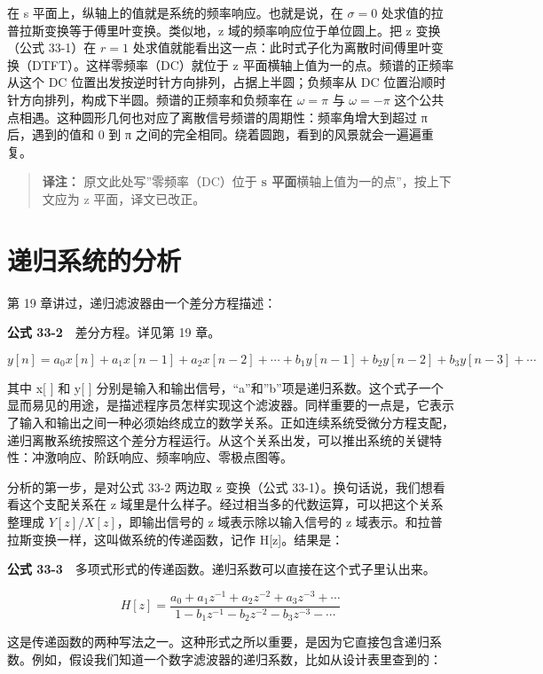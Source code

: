 在 s 平面上，纵轴上的值就是系统的频率响应。也就是说，在 \(\sigma = 0\)
处求值的拉普拉斯变换等于傅里叶变换。类似地，z
域的频率响应位于单位圆上。把 z 变换（公式 33-1）在 \(r = 1\)
处求值就能看出这一点：此时式子化为离散时间傅里叶变换（DTFT）。这样零频率（DC）就位于
z 平面横轴上值为一的点。频谱的正频率从这个 DC
位置出发按逆时针方向排列，占据上半圆；负频率从 DC
位置沿顺时针方向排列，构成下半圆。频谱的正频率和负频率在
\(\omega = \pi\) 与 \(\omega = -\pi\)
这个公共点相遇。这种圆形几何也对应了离散信号频谱的周期性：频率角增大到超过
π 后，遇到的值和 0 到 π
之间的完全相同。绕着圆跑，看到的风景就会一遍遍重复。

\begin{quote}
\textbf{译注：} 原文此处写''零频率（DC）位于 \textbf{s
平面}横轴上值为一的点''，按上下文应为 z 平面，译文已改正。
\end{quote}

\section{递归系统的分析}

第 19 章讲过，递归滤波器由一个差分方程描述：

\textbf{公式 33-2}　差分方程。详见第 19 章。

\[y[n] = a_0 x[n] + a_1 x[n-1] + a_2 x[n-2] + \cdots + b_1 y[n-1] + b_2 y[n-2] + b_3 y[n-3] + \cdots\]

其中 x{[} {]} 和 y{[} {]}
分别是输入和输出信号，``a''和''b''项是递归系数。这个式子一个显而易见的用途，是描述程序员怎样实现这个滤波器。同样重要的一点是，它表示了输入和输出之间一种必须始终成立的数学关系。正如连续系统受微分方程支配，递归离散系统按照这个差分方程运行。从这个关系出发，可以推出系统的关键特性：冲激响应、阶跃响应、频率响应、零极点图等。

分析的第一步，是对公式 33-2 两边取 z 变换（公式
33-1）。换句话说，我们想看看这个支配关系在 z
域里是什么样子。经过相当多的代数运算，可以把这个关系整理成
\(Y[z]/X[z]\)，即输出信号的 z 域表示除以输入信号的 z
域表示。和拉普拉斯变换一样，这叫做系统的传递函数，记作
H{[}z{]}。结果是：

\textbf{公式
33-3}　多项式形式的传递函数。递归系数可以直接在这个式子里认出来。

\[H[z] = \frac{a_0 + a_1 z^{-1} + a_2 z^{-2} + a_3 z^{-3} + \cdots}{1 - b_1 z^{-1} - b_2 z^{-2} - b_3 z^{-3} - \cdots}\]

这是传递函数的两种写法之一。这种形式之所以重要，是因为它直接包含递归系数。例如，假设我们知道一个数字滤波器的递归系数，比如从设计表里查到的：

